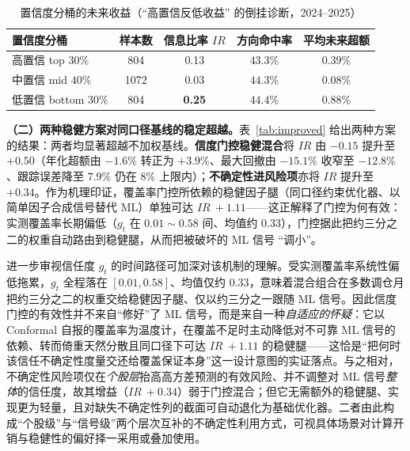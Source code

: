 \begin{table}[htbp]
\centering
\caption{置信度分桶的未来收益（``高置信反低收益'' 的倒挂诊断，2024--2025）}
\label{tab:buckets}
\begin{tabular}{lcccc}
\toprule
\textbf{置信度分桶} & \textbf{样本数} & \textbf{信息比率 $IR$} & \textbf{方向命中率} & \textbf{平均未来超额} \\
\midrule
高置信 top $30\%$ & 804 & 0.13 & $43.3\%$ & $0.39\%$ \\
中置信 mid $40\%$ & 1072 & 0.03 & $44.3\%$ & $0.08\%$ \\
低置信 bottom $30\%$ & 804 & \textbf{0.25} & $44.4\%$ & \textbf{$0.88\%$} \\
\bottomrule
\end{tabular}
\end{table}

\textbf{（二）两种稳健方案对同口径基线的稳定超越。}表~\ref{tab:improved} 给出两种方案的结果：两者均显著超越不加权基线。\textbf{信度门控稳健混合}将 $IR$ 由 $-0.15$ 提升至 $+0.50$（年化超额由 $-1.6\%$ 转正为 $+3.9\%$、最大回撤由 $-15.1\%$ 收窄至 $-12.8\%$、跟踪误差降至 $7.9\%$ 仍在 $8\%$ 上限内）；\textbf{不确定性进风险项}亦将 $IR$ 提升至 $+0.34$。作为机理印证，覆盖率门控所依赖的稳健因子腿（同口径约束优化器、以简单因子合成信号替代 ML）单独可达 $IR\ +1.11$——这正解释了门控为何有效：实测覆盖率长期偏低（$g_t$ 在 $0.01\!\sim\!0.58$ 间、均值约 0.33），门控据此把约三分之二的权重自动路由到稳健腿，从而把被破坏的 ML 信号 ``调小''。

进一步审视信任度 $g_t$ 的时间路径可加深对该机制的理解。受实测覆盖率系统性偏低拖累，$g_t$ 全程落在 $[0.01,0.58]$、均值仅约 $0.33$，意味着混合组合在多数调仓月把约三分之二的权重交给稳健因子腿、仅以约三分之一跟随 ML 信号。因此信度门控的有效性并不来自``修好''了 ML 信号，而是来自一种\emph{自适应的怀疑}：它以 Conformal 自报的覆盖率为温度计，在覆盖不足时主动降低对不可靠 ML 信号的依赖、转而倚重天然分散且同口径下可达 $IR\ +1.11$ 的稳健腿——这恰是``把何时该信任不确定性度量交还给覆盖保证本身''这一设计意图的实证落点。与之相对，不确定性风险项仅在\emph{个股层}抬高高方差预测的有效风险、并不调整对 ML 信号\emph{整体}的信任度，故其增益（$IR\ +0.34$）弱于门控混合；但它无需额外的稳健腿、实现更为轻量，且对缺失不确定性列的截面可自动退化为基础优化器。二者由此构成``个股级''与``信号级''两个层次互补的不确定性利用方式，可视具体场景对计算开销与稳健性的偏好择一采用或叠加使用。

